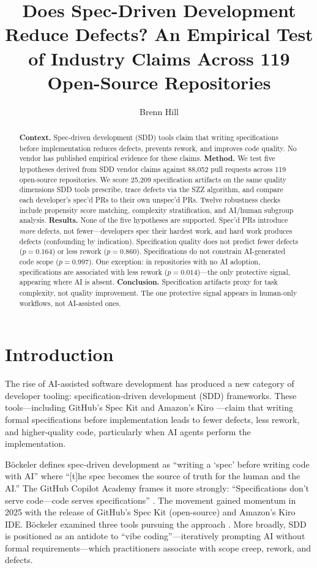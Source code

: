 \documentclass[a4paper,UKenglish,cleveref,autoref,thm-restate]{lipics-v2021}
\title{Does Spec-Driven Development Reduce Defects? An Empirical Test of Industry Claims Across 119 Open-Source Repositories}
\author{Brenn Hill}{Independent Researcher}{brenn@brennhill.com}{https://orcid.org/0009-0001-7662-9498}{}
\begin{document}
\maketitle

\begin{abstract}
\textbf{Context.} Spec-driven development (SDD) tools claim that writing specifications before implementation reduces defects, prevents rework, and improves code quality. No vendor has published empirical evidence for these claims.
\textbf{Method.} We test five hypotheses derived from SDD vendor claims against 88,052 pull requests across 119 open-source repositories. We score 25,209 specification artifacts on the same quality dimensions SDD tools prescribe, trace defects via the SZZ algorithm, and compare each developer's spec'd PRs to their own unspec'd PRs. Twelve robustness checks include propensity score matching, complexity stratification, and AI/human subgroup analysis.
\textbf{Results.} None of the five hypotheses are supported. Spec'd PRs introduce \emph{more} defects, not fewer---developers spec their hardest work, and hard work produces defects (confounding by indication). Specification quality does not predict fewer defects ($p = 0.164$) or less rework ($p = 0.860$). Specifications do not constrain AI-generated code scope ($p = 0.997$). One exception: in repositories with no AI adoption, specifications are associated with less rework ($p = 0.014$)---the only protective signal, appearing where AI is absent.
\textbf{Conclusion.} Specification artifacts proxy for task complexity, not quality improvement. The one protective signal appears in human-only workflows, not AI-assisted ones.
\end{abstract}

\section{Introduction}

\noindent
The rise of AI-assisted software development has produced a new category of developer tooling: specification-driven development (SDD) frameworks. These tools---including GitHub's Spec Kit \cite{speckit2025} and Amazon's Kiro \cite{kiro2025}---claim that writing formal specifications before implementation leads to fewer defects, less rework, and higher-quality code, particularly when AI agents perform the implementation.

B\"ockeler \cite{fowler2025} defines spec-driven development as ``writing a `spec' before writing code with AI'' where ``[t]he spec becomes the source of truth for the human and the AI.'' The GitHub Copilot Academy frames it more strongly: ``Specifications don't serve code---code serves specifications'' \cite{copilotacademy2025}. The movement gained momentum in 2025 with the release of GitHub's Spec Kit (open-source) and Amazon's Kiro IDE. B\"ockeler examined three tools pursuing the approach \cite{fowler2025}. More broadly, SDD is positioned as an antidote to ``vibe coding''---iteratively prompting AI without formal requirements---which practitioners associate with scope creep, rework, and defects.
\end{document}
